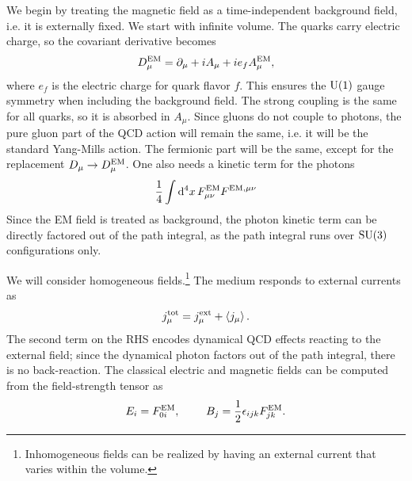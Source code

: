 We begin by treating the magnetic field as a time-independent background field,
i.e. it is externally fixed. We start with infinite volume. The quarks carry
electric charge, so the covariant derivative becomes
\begin{equation}\label{eq:covDerivEM}
D^{\rm EM}_\mu=\partial_\mu+iA_\mu+ie_fA^{\rm EM}_\mu,
\end{equation}
where $e_f$ is the electric charge for quark flavor $f$. This ensures the
$\operatorname{U}(1)$ gauge symmetry when including the background field. The strong coupling
is the same for all quarks, so it is absorbed in $A_\mu$. 
Since gluons do not couple to photons, the pure gluon part of the QCD action will
remain the same, i.e. it will be the standard Yang-Mills action. The fermionic
part will be the same, except for the replacement $D_\mu\to D^{\rm EM}_\mu$. One also
needs a kinetic term for the photons
\begin{equation}
\frac{1}{4}\int\dd[4]{x}F^{\rm EM}_{\mu\nu} F^{\rm EM,\mu\nu}
\end{equation} 
Since the EM field is treated as background, the photon kinetic term can be
directly factored out of the path integral, as the path integral runs over
$\operatorname{SU}(3)$ configurations only.

We will consider homogeneous fields.\footnote{Inhomogeneous fields can be
realized by having an external current that varies within the volume.} The
medium responds to external currents as
\begin{equation}
j_\mu^{\rm tot}=j_\mu^{\rm ext}+\ev{j_\mu}.
\end{equation}
The second term on the RHS encodes dynamical QCD effects reacting to the
external field; since the dynamical photon factors out of the path integral,
there is no back-reaction. The classical electric and magnetic fields can be
computed from the field-strength tensor as
\begin{equation}
E_i=F^{\rm EM}_{0i},~~~~~~~B_j=\frac{1}{2}\epsilon_{ijk}F^{\rm EM}_{jk}.
\end{equation}



